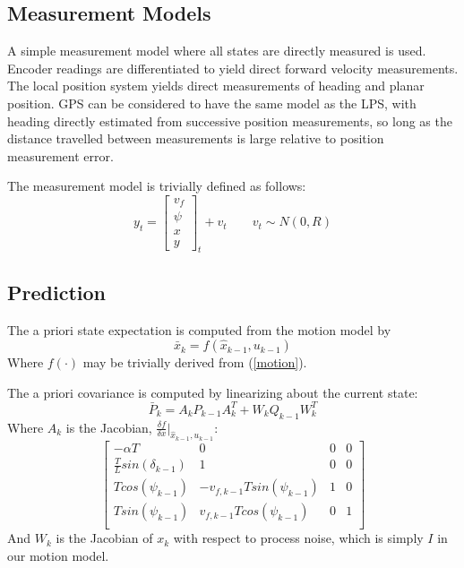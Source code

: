\documentclass[11pt]{article} %
\begin{document}
\subsection{Measurement Models}

A simple measurement model where all states are directly measured is used.  Encoder readings are differentiated to yield direct forward velocity measurements.
The local position system yields direct measurements of heading and planar position.  
GPS can be considered to have the same model as the LPS, with heading directly estimated from successive position measurements, so long as the distance travelled between measurements is large relative to position measurement error.

The measurement model is trivially defined as follows:
\begin{equation}
y_t = \left[ \begin{array}{c} v_f \\ \psi \\ x \\ y \end{array} \right]_t + v_t 
\quad \quad v_t \sim N(0,R)
\end{equation}

\subsection{Prediction}

The a priori state expectation is computed from the motion model by
\begin{equation}
\bar{x}_k = f(\hat{x}_{k-1}, u_{k-1})
\end{equation}
Where $f(\cdotp)$ may be trivially derived from (\ref{motion}).

The a priori covariance is computed by linearizing about the current state:
\begin{equation}
\bar{P}_k = A_kP_{k-1}A_k^T + W_kQ_{k-1}W_k^T
\end{equation}
Where $A_k$ is the Jacobian, $\frac{\delta f}{\delta x} | _{\hat{x}_{k-1}, u_{k-1}}$:
\renewcommand{\arraystretch}{1.4}
\begin{equation}
\left[ \begin{array}{cccc}
-\alpha T & 0 & 0 & 0 \\
\frac{T}{L} sin( \delta _{k-1} ) & 1 & 0 & 0 \\
T cos(\psi _{k-1}) & - v_{f,k-1} T sin( \psi _{k-1}) & 1 & 0 \\
T sin(\psi _{k-1}) & v_{f,k-1} T cos ( \psi _{k-1}) & 0 & 1 \\
\end{array} \right]
\end{equation}
\renewcommand{\arraystretch}{1}
And $W_k$ is the Jacobian of $x_k$ with respect to process noise, which is simply $I$ in our motion model.
\end{document}
